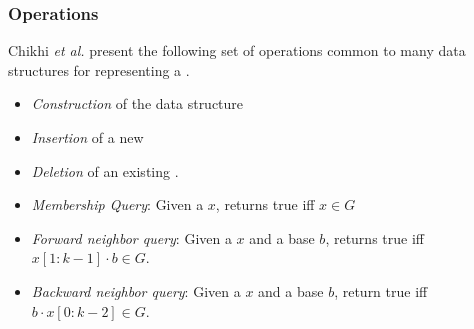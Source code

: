 
\subsubsection{Operations}

Chikhi \emph{et al.} \cite{Chikhi2019} present the following set of operations common to many data structures for representing a \dBG {}.

\begin{itemize}
  \item \emph{Construction} of the data structure
  \item \emph{Insertion} of a new \kmer {}
  \item \emph{Deletion} of an existing \kmer.
  \item \emph{Membership Query}: Given a \kmer $x$, returns true iff $x \in G$
  \item \emph{Forward neighbor query}: Given a \kmer $x$ and a base $b$, returns true iff $x[1:k-1] \cdot b \in G$.
  \item \emph{Backward neighbor query}: Given a \kmer $x$ and a base $b$, return true iff $b \cdot x[0:k-2] \in G$.
\end{itemize}

